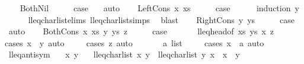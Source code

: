 \begin{isabellebody}
\ \ \isamarkupfalse%
\ BothNil\isanewline
\ \ \isamarkupfalse%
\ \isamarkupfalse%
\ {\isacharquery}case\ \ \isamarkupfalse%
\ auto\isanewline
{}\isamarkupfalse%
\isanewline
\ \ \isamarkupfalse%
\ {\isacharparenleft}LeftCons\ x\ xs{\isacharparenright}\isanewline
\ \ \isamarkupfalse%
\ \isamarkupfalse%
\ {\isacharquery}case\ \isanewline
\ \ \ \ \isamarkupfalse%
{\isacharparenleft}induction\ y{\isacharparenright}\isanewline
\ \ \ \ \isamarkupfalse%
\ lleq{\isacharunderscore}charlist{\isachardot}elims{\isacharparenleft}{}{\isacharparenright}\ lleq{\isacharunderscore}charlist{\isachardot}simps{\isacharparenleft}{}{\isacharparenright}\ \isamarkupfalse%
\ blast{\isacharplus}\isanewline
{}\isamarkupfalse%
\isanewline
\ \ \isamarkupfalse%
\ {\isacharparenleft}RightCons\ y\ ys{\isacharparenright}\isanewline
\ \ \isamarkupfalse%
\ \isamarkupfalse%
\ {\isacharquery}case\ \isamarkupfalse%
\ auto\isanewline
{}\isamarkupfalse%
\isanewline
\ \ \isamarkupfalse%
\ {\isacharparenleft}BothCons\ x\ xs\ y\ ys\ z{\isacharparenright}\isanewline
\ \ \isamarkupfalse%
\ \isamarkupfalse%
\ {\isacharquery}case\ \isanewline
\ \ \ \ \isamarkupfalse%
\ lleq{\isacharunderscore}head{\isacharbrackleft}of\ xs\ ys\ x\ z{\isacharbrackright}\ \isamarkupfalse%
{\isacharparenleft}cases\ {\isachardoublequoteopen}x\ {\isacharequal}\ y{\isachardoublequoteclose}{\isacharcomma}\ auto{\isacharparenright}\isanewline
\ \ \ \ \isamarkupfalse%
{\isacharparenleft}cases\ z{\isacharcomma}\ auto{\isacharparenright}\isanewline
\ \ \ \ \isamarkupfalse%
\ \ a\ list\isanewline
\ \ \ \ \isamarkupfalse%
{\isacharparenleft}cases\ {\isachardoublequoteopen}x\ {\isacharequal}\ a{\isachardoublequoteclose}{\isacharcomma}\ auto{\isacharparenright}\isanewline
\ \ \ \ \isamarkupfalse%
\isanewline
{}\isamarkupfalse%
%
\endisatagproof
{\isafoldproof}%
%
\isadelimproof
\isanewline
%
\endisadelimproof
\isanewline
{}\isamarkupfalse%
\ lleq{\isacharunderscore}antisym{\isacharcolon}\isanewline
\ \ \ x\ y\isanewline
\ \ \ {\isachardoublequoteopen}lleq{\isacharunderscore}charlist\ x\ y\ {\isasymLongrightarrow}\ lleq{\isacharunderscore}charlist\ y\ x\ {\isasymLongrightarrow}\ x\ {\isacharequal}\ y{\isachardoublequoteclose}\isanewline

\end{isabellebody}

